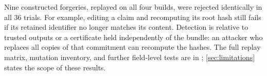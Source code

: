 Nine constructed forgeries, replayed on all four builds, were rejected identically in all 36 trials. For example, editing a claim and recomputing its root hash still fails if its retained identifier no longer matches its content. Detection is relative to trusted outputs or a certificate held independently of the bundle: an attacker who replaces all copies of that commitment can recompute the hashes. The full replay matrix, mutation inventory, and further field-level tests are in ; \cref{sec:limitations} states the scope of these results.
